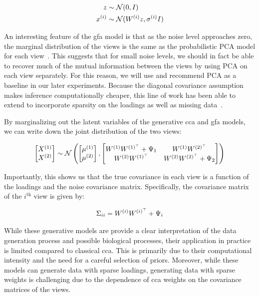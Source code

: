 \begin{align}
    z& \sim \mathcal{N}(0, I)\\
    x^{(i)} & \sim \mathcal{N}(W^{(i)} z, \sigma^{(i)}I)
\end{align}

An interesting feature of the \acrshort{gfa} model is that as the noise level approaches zero, the marginal distribution of the views is the same as the probabilistic PCA model for each view~\citep{tipping1999probabilistic}.
This suggests that for small noise levels, we should in fact be able to recover much of the mutual information between the views by using PCA on each view separately.
For this reason, we will use and recommend PCA as a baseline in our later experiments.
Because the diagonal covariance assumption makes inference computationally cheaper, this line of work has been able to extend to incorporate sparsity on the loadings\citep{virtanen2011bayesian} as well as missing data~\citep{ferreira2022hierarchical}.

By marginalizing out the latent variables of the generative \acrshort{cca} and \acrshort{gfa} models, we can write down the joint distribution of the two views:

\begin{align}
    \begin{bmatrix} X^{(1)} \\ X^{(2)} \end{bmatrix} \sim \mathcal{N} \left( \begin{bmatrix} \mu^{(1)} \\ \mu^{(2)} \end{bmatrix}, \begin{bmatrix} W^{(1)}W^{(1)^{\top}} + \Psi_1 & W^{(1)}W^{(2)^{\top}} \\ W^{(2)}W^{(1)^{\top}} & W^{(2)}W^{(2)^{\top}} + \Psi_2 \end{bmatrix} \right)
\end{align}

Importantly, this shows us that the true covariance in each view is a function of the \gls{loadings} and the noise covariance matrix.
Specifically, the covariance matrix of the $i^{\text{th}}$ view is given by:

\begin{align}
    \Sigma_{ii} = W^{(i)}W^{(i)^{\top}} + \Psi_i
\end{align}

While these generative models are provide a clear interpretation of the data generation process and possible biological processes, their application in practice is limited compared to classical \acrshort{cca}.
This is primarily due to their computational intensity and the need for a careful selection of priors.
Moreover, while these models can generate data with sparse loadings, generating data with sparse weights is challenging due to the dependence of \acrshort{cca} weights on the covariance matrices of the views.


